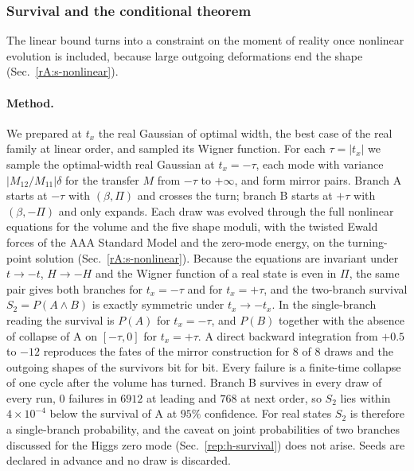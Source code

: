 \subsubsection{Survival and the conditional theorem}
\label{rA:s-conditional}

The linear bound turns into a constraint on the moment of reality once nonlinear evolution is included, because large outgoing deformations end the shape (Sec.~\ref{rA:s-nonlinear}).

\paragraph{Method.}
We prepared at $t_x$ the real Gaussian of optimal width, the best case of the real family at linear order, and sampled its Wigner function.
For each $\tau=|t_x|$ we sample the optimal-width real Gaussian at $t_x=-\tau$, each mode with variance $|M_{12}/M_{11}|\delta$ for the transfer $M$ from $-\tau$ to $+\infty$, and form mirror pairs.
Branch A starts at $-\tau$ with $(\beta,\Pi)$ and crosses the turn; branch B starts at $+\tau$ with $(\beta,-\Pi)$ and only expands.
Each draw was evolved through the full nonlinear equations for the volume and the five shape moduli, with the twisted Ewald forces of the AAA Standard Model and the zero-mode energy, on the turning-point solution (Sec.~\ref{rA:s-nonlinear}).
Because the equations are invariant under $t\to-t$, $H\to-H$ and the Wigner function of a real state is even in $\Pi$, the same pair gives both branches for $t_x=-\tau$ and for $t_x=+\tau$, and the two-branch survival $S_2=P(A\wedge B)$ is exactly symmetric under $t_x\to-t_x$.
In the single-branch reading the survival is $P(A)$ for $t_x=-\tau$, and $P(B)$ together with the absence of collapse of A on $[-\tau,0]$ for $t_x=+\tau$.
A direct backward integration from $+0.5$ to $-12$ reproduces the fates of the mirror construction for 8 of 8 draws and the outgoing shapes of the survivors bit for bit. %
Every failure is a finite-time collapse of one cycle after the volume has turned.
Branch B survives in every draw of every run, $0$ failures in $6912$ at leading and $768$ at next order, so $S_2$ lies within $4\times10^{-4}$ below the survival of A at $95\%$ confidence. %
For real states $S_2$ is therefore a single-branch probability, and the caveat on joint probabilities of two branches discussed for the Higgs zero mode (Sec.~\ref{rep:h-survival}) does not arise.
Seeds are declared in advance and no draw is discarded.

